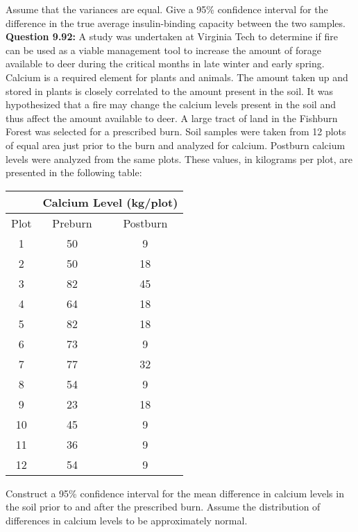 \documentclass{article}
\begin{document}
Assume that the variances are equal. Give a 95\% 
confidence interval for the difference in the true average
insulin-binding capacity between the two samples.\\\newline
\textbf{Question 9.92:}
A study was undertaken at Virginia Tech to determine if 
fire can be used as a viable management tool to increase 
the amount of forage available to deer during the critical 
months in late winter and early spring. Calcium is a 
required element for plants and animals. The amount taken 
up and stored in plants is closely correlated to the amount 
present in the soil. It was hypothesized that a fire may 
change the calcium levels present in the soil and thus 
affect the amount available to deer. A large tract of land 
in the Fishburn Forest was selected for a prescribed burn. 
Soil samples were taken from 12 plots of equal area just 
prior to the burn and analyzed for calcium. Postburn 
calcium levels were analyzed from the same plots. These 
values, in kilograms per plot, are presented in the 
following table:
\begin{center}
\begin{tabular}{c c c}
    & \multicolumn{2}{c}{Calcium Level (kg/plot)}\\
    \hline
    Plot & Preburn & Postburn \\
    \hline
    1  & 50 & 9  \\
    2  & 50 & 18 \\
    3  & 82 & 45 \\
    4  & 64 & 18 \\
    5  & 82 & 18 \\
    6  & 73 & 9  \\
    7  & 77 & 32 \\
    8  & 54 & 9  \\
    9  & 23 & 18 \\
    10 & 45 & 9  \\
    11 & 36 & 9  \\
    12 & 54 & 9  \\
\end{tabular}
\end{center}
Construct a 95\% confidence interval for the mean 
difference in calcium levels in the soil prior to and 
after the prescribed burn. Assume the distribution of 
differences in calcium levels to be approximately normal.
\\\newline
\end{document}
